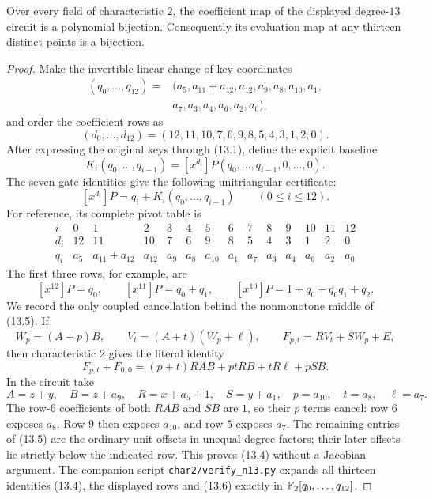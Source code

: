 \begin{lemma}
\label{lem:char2-degree13-inverse}
Over every field of characteristic $2$, the coefficient map of the displayed
degree-$13$ circuit is a polynomial bijection.  Consequently its evaluation
map at any thirteen distinct points is a bijection.
\end{lemma}
\begin{proof}
Make the invertible linear change of key coordinates
\[
\begin{aligned}
(q_0,\ldots,q_{12})={}&(a_5, a_{11}+a_{12}, a_{12}, a_9, a_8, a_{10},
 a_1,\\
&a_7, a_3, a_4, a_6, a_2, a_0),
\end{aligned}                                                    \tag{13.1}
\]
and order the coefficient rows as
\[
 (d_0,\ldots,d_{12})=(12,11,10,7,6,9,8,5,4,3,1,2,0).
                                                               \tag{13.2}
\]
After expressing the original keys through (13.1), define the explicit
baseline
\[
 K_i(q_0,\ldots,q_{i-1})
   =[x^{d_i}]P(q_0,\ldots,q_{i-1},0,\ldots,0).
                                                               \tag{13.3}
\]
The seven gate identities give the following unitriangular certificate:
\[
 [x^{d_i}]P=q_i+K_i(q_0,\ldots,q_{i-1})\qquad(0\le i\le12).
                                                               \tag{13.4}
\]
For reference, its complete pivot table is
\[
\begin{array}{c|rrrrrrrrrrrrr}
i&0&1&2&3&4&5&6&7&8&9&10&11&12\\ \hline
d_i&12&11&10&7&6&9&8&5&4&3&1&2&0\\
q_i&a_5&a_{11}{+}a_{12}&a_{12}&a_9&a_8&a_{10}&a_1&a_7&a_3&a_4&a_6&a_2&a_0
\end{array}                                                     \tag{13.5}
\]
The first three rows, for example, are
\[
 [x^{12}]P=q_0,\qquad [x^{11}]P=q_0+q_1,
 \qquad [x^{10}]P=1+q_0+q_0q_1+q_2.
\]
We record the only coupled cancellation behind the nonmonotone middle of
(13.5).  If
\[
 W_p=(A+p)B,\qquad V_t=(A+t)(W_p+\ell),\qquad
 F_{p,t}=RV_t+SW_p+E,
\]
then characteristic $2$ gives the literal identity
\[
 F_{p,t}+F_{0,0}
  =(p+t)RAB+ptRB+tR\ell+pSB.                         \tag{13.6}
\]
In the circuit take
\[
 A=z+y,\quad B=z+a_9,\quad R=x+a_5+1,\quad S=y+a_1,\quad
 p=a_{10},\quad t=a_8,\quad \ell=a_7.
\]
The row-$6$ coefficients of both $RAB$ and $SB$ are $1$, so their $p$
terms cancel: row $6$ exposes $a_8$.  Row $9$ then exposes $a_{10}$, and
row $5$ exposes $a_7$.  The remaining entries of (13.5) are the ordinary
unit offsets in unequal-degree factors; their later offsets lie strictly
below the indicated row.  This proves (13.4) without a Jacobian argument.
The companion script \texttt{char2/verify\_n13.py} expands all thirteen
identities (13.4), the displayed rows and (13.6) exactly in
$\mathbb{F}_2[q_0,\ldots,q_{12}]$.


\end{proof}

